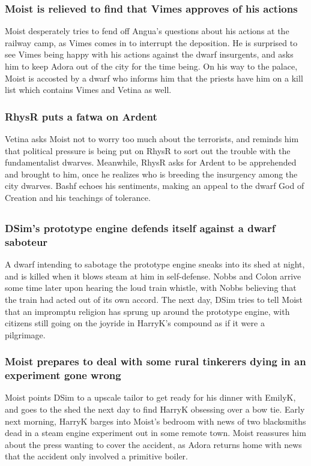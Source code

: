 \subsubsection{\Gls{Moist} is relieved to find that \Gls{Vimes} approves of his actions}
\Gls{Moist} desperately tries to fend off \Gls{Angua}'s questions about his actions at the railway
camp, as \Gls{Vimes} comes in to interrupt the deposition. He is surprised to see \Gls{Vimes} being
happy with his actions against the dwarf insurgents, and asks him to keep \Gls{Adora} out of the
city for the time being. On his way to the palace, \Gls{Moist} is accosted by a dwarf who informs
him that the priests have him on a kill list which contains \Gls{Vimes} and \Gls{Vetina} as well.

\subsubsection{\Gls{RhysR} puts a fatwa on \Gls{Ardent}}
\Gls{Vetina} asks \Gls{Moist} not to worry too much about the terrorists, and reminds him that
political pressure is being put on \Gls{RhysR} to sort out the trouble with the fundamentalist
dwarves. Meanwhile, \Gls{RhysR} asks for \Gls{Ardent} to be apprehended and brought to him, once
he realizes who is breeding the insurgency among the city dwarves. \Gls{Bashf} echoes his
sentiments, making an appeal to the dwarf God of Creation and his teachings of tolerance.

\subsection{}
\subsubsection{\Gls{DSim}'s prototype engine defends itself against a dwarf saboteur}
A dwarf intending to sabotage the prototype engine sneaks into its shed at night, and is killed when
it blows steam at him in self-defense. \Gls{Nobbs} and \Gls{Colon} arrive some time later upon
hearing the loud train whistle, with \Gls{Nobbs} believing that the train had acted out of its own
accord. The next day, \Gls{DSim} tries to tell \Gls{Moist} that an impromptu religion has sprung up
around the prototype engine, with citizens still going on the joyride in \Gls{HarryK}'s compound
as if it were a pilgrimage.

\subsubsection{\Gls{Moist} prepares to deal with some rural tinkerers dying in an experiment gone
    wrong}
\Gls{Moist} points \Gls{DSim} to a upscale tailor to get ready for his dinner with \Gls{EmilyK}, and
goes to the shed the next day to find \Gls{HarryK} obsessing over a bow tie. Early next morning,
\Gls{HarryK} barges into \Gls{Moist}'s bedroom with news of two blacksmiths dead in a steam engine
experiment out in some remote town. \Gls{Moist} reassures him about the press wanting to cover the
accident, as \Gls{Adora} returns home with news that the accident only involved a primitive boiler.

